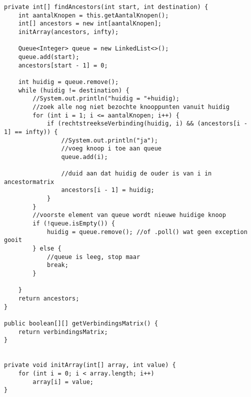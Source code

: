 \begin{oef}
\begin{opl}
\begin{lstlisting}[caption={findAncestors(int,int)}, label=BFSAncestors]
private int[] findAncestors(int start, int destination) {
	int aantalKnopen = this.getAantalKnopen();
	int[] ancestors = new int[aantalKnopen];
	initArray(ancestors, infty);

	Queue<Integer> queue = new LinkedList<>();
	queue.add(start);
	ancestors[start - 1] = 0;

	int huidig = queue.remove();
	while (huidig != destination) {
		//System.out.println("huidig = "+huidig);
		//zoek alle nog niet bezochte knooppunten vanuit huidig
		for (int i = 1; i <= aantalKnopen; i++) {
			if (rechtstreekseVerbinding(huidig, i) && (ancestors[i - 1] == infty)) {
				//System.out.println("ja");
				//voeg knoop i toe aan queue
				queue.add(i);
					
				//duid aan dat huidig de ouder is van i in ancestormatrix
				ancestors[i - 1] = huidig;
			}
		}
		//voorste element van queue wordt nieuwe huidige knoop
		if (!queue.isEmpty()) {
			huidig = queue.remove(); //of .poll() wat geen exception gooit
		} else {
			//queue is leeg, stop maar
			break;
		}
		
	}
	return ancestors;
}

public boolean[][] getVerbindingsMatrix() {
	return verbindingsMatrix;
}


private void initArray(int[] array, int value) {
	for (int i = 0; i < array.length; i++)
		array[i] = value;
}
\end{lstlisting}
\end{opl}
\end{oef}

